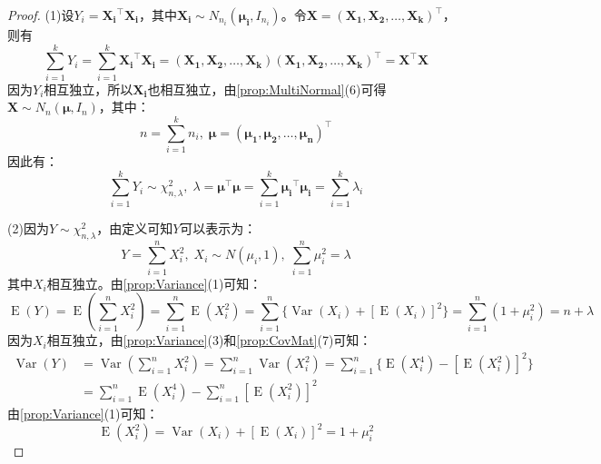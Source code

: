 \begin{proof}
	(1)设$Y_i=\mathbf{X_i}^{\top}\mathbf{X_i}$，其中$\mathbf{X_i}\sim N_{n_i}(\boldsymbol{\mu_i},I_{n_i})$。令$\mathbf{X}=(\mathbf{X_1},\mathbf{X_2},\dots,\mathbf{X_k})^{\top}$，则有
	\begin{equation*}
		\sum_{i=1}^{k}Y_i=\sum_{i=1}^{k}\mathbf{X_i}^{\top}\mathbf{X_i}=(\mathbf{X_1},\mathbf{X_2},\dots,\mathbf{X_k})(\mathbf{X_1},\mathbf{X_2},\dots,\mathbf{X_k})^{\top}=\mathbf{X}^{\top}\mathbf{X}
	\end{equation*}
	因为$Y_i$相互独立，所以$\mathbf{X_i}$也相互独立，由\cref{prop:MultiNormal}(6)可得$\mathbf{X}\sim N_n(\boldsymbol{\mu},I_n)$，其中：
	\begin{equation*}
		n=\sum_{i=1}^{k}n_i,\;\boldsymbol{\mu}=(\boldsymbol{\mu_1},\boldsymbol{\mu_2},\dots,\boldsymbol{\mu_n})^{\top}
	\end{equation*}
	因此有：
	\begin{equation*}
		\sum_{i=1}^{k}Y_i\sim\chi_{n,\lambda}^2,\;\lambda=\boldsymbol{\mu}^{\top}\boldsymbol{\mu}=\sum_{i=1}^{k}\boldsymbol{\mu_i}^{\top}\boldsymbol{\mu_i}=\sum_{i=1}^{k}\lambda_i
	\end{equation*}\par
	(2)因为$Y\sim\chi_{n,\lambda}^2$，由定义可知$Y$可以表示为：
	\begin{equation*}
		Y=\sum_{i=1}^{n}X_i^2,\;X_i\sim N(\mu_i,1),\;\sum_{i=1}^{n}\mu_i^2=\lambda
	\end{equation*}
	其中$X_i$相互独立。由\cref{prop:Variance}(1)可知：
	\begin{equation*}
		\operatorname{E}(Y)=\operatorname{E}\left(\sum_{i=1}^{n}X_i^2\right)=\sum_{i=1}^{n}\operatorname{E}(X_i^2)=\sum_{i=1}^{n}\{\operatorname{Var}(X_i)+[\operatorname{E}(X_i)]^2\}=\sum_{i=1}^{n}(1+\mu_i^2)=n+\lambda
	\end{equation*}
	因为$X_i$相互独立，由\cref{prop:Variance}(3)和\cref{prop:CovMat}(7)可知：
	\begin{align*}
		\operatorname{Var}(Y)
		&=\operatorname{Var}\left(\sum_{i=1}^{n}X_i^2\right)=\sum_{i=1}^{n}\operatorname{Var}(X_i^2)=\sum_{i=1}^{n}\{\operatorname{E}(X_i^4)-[\operatorname{E}(X_i^2)]^2\} \\
		&=\sum_{i=1}^{n}\operatorname{E}(X_i^4)-\sum_{i=1}^{n}[\operatorname{E}(X_i^2)]^2
	\end{align*}
	由\cref{prop:Variance}(1)可知：
	\begin{equation*}
		\operatorname{E}(X_i^2)=\operatorname{Var}(X_i)+[\operatorname{E}(X_i)]^2=1+\mu_i^2
	\end{equation*}

\end{proof}
